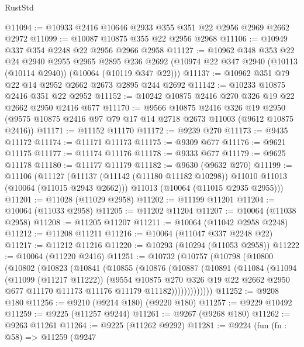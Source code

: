 \begin{lexlean}{RustStd}
\begin{coremodule}
@11094 := @10933 @2416 @10646 @2933 @355 @351 @22 @2956 @2969 @2662 @2972
@11099 := @10087 @10875 @355 @22 @2956 @2968
@11106 := @10949 @337 @354 @2248 @22 @2956 @2966 @2958
@11127 := @10962
    @348
    @353
    @22
    @24
    @2940
    @2955
    @2965
    @2895
    @236
    @2692
    (@10974 @22 @347 @2940 (@10113 (@10114 @2940)) (@10064 (@10119 @347 @22)))
@11137 := @10962 @351 @79 @22 @14 @2952 @2662 @2673 @2895 @244 @2692
@11142 := @10233 @10875 @2416 @351 @22 @2952
@11152 := @10242 @10875 @2416 @270 @326 @19 @22 @2662 @2950 @2416 @677
@11170 := @9566
    @10875
    @2416
    @326
    @19
    @2950
    (@9575 @10875 @2416 @97 @79 @17 @14 @2718 @2673 @11003 (@9612 @10875 @2416))
@11171 := @11152 @11170
@11172 := @9239 @270
@11173 := @9435 @11172
@11174 := @11171 @11173
@11175 := @9309 @677
@11176 := @9621 @11175
@11177 := @11174 @11176
@11178 := @9333 @677
@11179 := @9625 @11178
@11180 := @11177 @11179
@11182 := @9630 (@9632 @270)
@11199 := @11106
    (@11127
      (@11137 (@11142 (@11180 @11182 @10298)) @11010 @11013 (@10064 (@11015 @2943 @2662)))
      @11013
      (@10064 (@11015 @2935 @2955)))
@11201 := @11028 (@11029 @2958)
@11202 := @11199 @11201
@11204 := @10064 (@11033 @2958)
@11205 := @11202 @11204
@11207 := @10064 (@11038 @2958)
@11208 := @11205 @11207
@11211 := @10064 (@11042 @2958 @2248)
@11212 := @11208 @11211
@11216 := @10064 (@11047 @337 @2248 @22)
@11217 := @11212 @11216
@11220 := @10293 (@10294 (@11053 @2958))
@11222 := @10064 (@11220 @2416)
@11251 := @10732
    (@10757
      (@10798
        (@10800
          (@10802
            (@10823
              (@10841
                (@10855
                  (@10876
                    (@10887
                      (@10891
                        (@11084
                          (@11094
                            (@11099 (@11217 @11222))
                            (@9554
                              @10875
                              @270
                              @326
                              @19
                              @22
                              @2662
                              @2950
                              @677
                              @11170
                              @11173
                              @11176
                              @11179
                              @11182)))))))))))))
@11252 := @9208 @180
@11256 := @9210 (@9214 @180) (@9220 @180)
@11257 := @9229 @10492
@11259 := @9225 (@11257 @9244)
@11261 := @9267 (@9268 @180)
@11262 := @9263 @11261
@11264 := @9225 (@11262 @9292)
@11281 := @9224
    (fun (fn : @58) =>
    @11259
      (@9247

\end{coremodule}
\end{lexlean}
